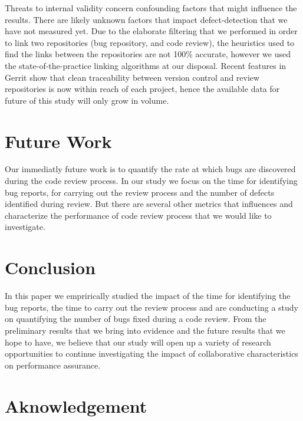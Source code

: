 \documentclass[ifip]{svmult}
\begin{document}
Threats to internal validity concern confounding factors that might influence the results. There
are likely unknown factors that impact defect-detection that we have not measured yet.
Due to the elaborate filtering that we performed in order to link two repositories (bug repository, 
and code review), the  heuristics  used  to  find  the
links  between  the  repositories  are  not  100\%  accurate,
however  we  used  the  state-of-the-practice  linking  algorithms
at  our  disposal.  Recent  features  in  Gerrit  show  that  clean
traceability  between  version  control  and  review  repositories
is now within reach of each project, hence the available data
for future of this study will only grow in volume.

\section{Future Work}
\label{sec:7} 

Our immediatly future work is to quantify the rate at which bugs are discovered during the code review process. 
In our study we focus on the time for identifying bug reports, for carrying out the review process and the number
of defects identified during review. But there are several other metrics that influences and characterize the 
performance of code review process that we would like to investigate.

\section{Conclusion}
\label{sec:8} 

In this paper we emprirically studied the impact of the time for identifying the bug reports, the time to carry out
the review process and are conducting a study on quantifying the number of bugs fixed during a code review. 
From the preliminary results that we bring into evidence and the future results that we hope to have, we believe that 
our study will open up a variety of research opportunities to continue investigating the impact of collaborative 
characteristics on performance assurance.   

\section{Aknowledgement}
\end{document}
